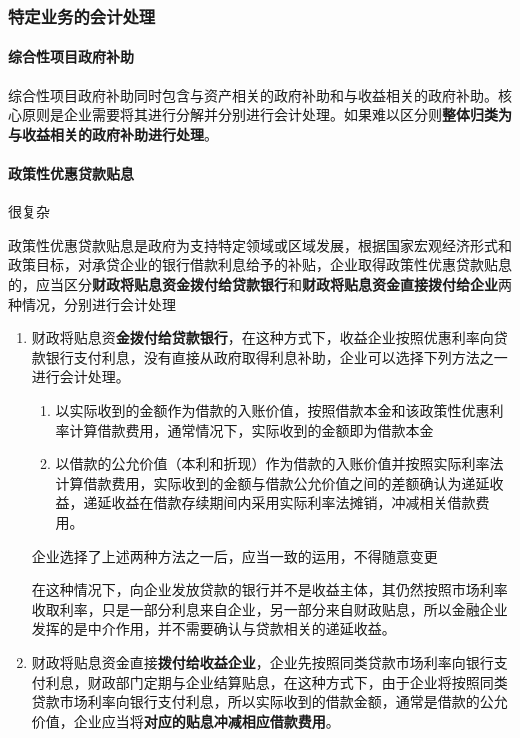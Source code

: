 \documentclass[UTF8,12pt]{ctexart}
\numberwithin{equation}{section} %
\numberwithin{figure}{section}
\numberwithin{table}{section}
\begin{document}
	\subsubsection{特定业务的会计处理}
	\paragraph{综合性项目政府补助}
	综合性项目政府补助同时包含与资产相关的政府补助和与收益相关的政府补助。核心原则是企业需要将其进行分解并分别进行会计处理。如果难以区分则\textbf{整体归类为与收益相关的政府补助进行处理}。
	
	\paragraph{政策性优惠贷款贴息}
	很复杂
	
	政策性优惠贷款贴息是政府为支持特定领域或区域发展，根据国家宏观经济形式和政策目标，对承贷企业的银行借款利息给予的补贴，企业取得政策性优惠贷款贴息的，应当区分\textbf{财政将贴息资金拨付给贷款银行}和\textbf{财政将贴息资金直接拨付给企业}两种情况，分别进行会计处理
	\begin{enumerate}
		\item 财政将贴息资\textbf{金拨付给贷款银行}，在这种方式下，收益企业按照优惠利率向贷款银行支付利息，没有直接从政府取得利息补助，企业可以选择下列方法之一进行会计处理。
		\begin{enumerate}
			\item 以实际收到的金额作为借款的入账价值，按照借款本金和该政策性优惠利率计算借款费用，通常情况下，实际收到的金额即为借款本金
			
			\item 以借款的公允价值（本利和折现）作为借款的入账价值并按照实际利率法计算借款费用，实际收到的金额与借款公允价值之间的差额确认为递延收益，递延收益在借款存续期间内采用实际利率法摊销，冲减相关借款费用。
		\end{enumerate}
		企业选择了上述两种方法之一后，应当一致的运用，不得随意变更
		
		在这种情况下，向企业发放贷款的银行并不是收益主体，其仍然按照市场利率收取利率，只是一部分利息来自企业，另一部分来自财政贴息，所以金融企业发挥的是中介作用，并不需要确认与贷款相关的递延收益。
		
		\item 财政将贴息资金直接\textbf{拨付给收益企业}，企业先按照同类贷款市场利率向银行支付利息，财政部门定期与企业结算贴息，在这种方式下，由于企业将按照同类贷款市场利率向银行支付利息，所以实际收到的借款金额，通常是借款的公允价值，企业应当将\textbf{对应的贴息冲减相应借款费用}。
	\end{enumerate}
	
\end{document}
